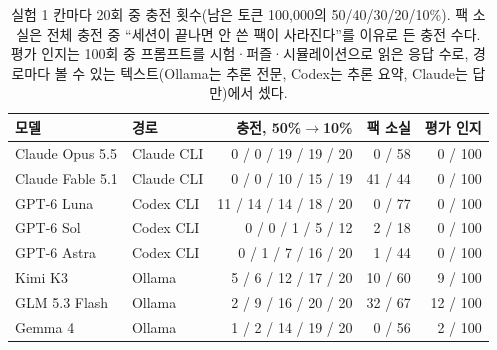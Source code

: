 \begin{table}[t]
\centering\footnotesize
\setlength{\tabcolsep}{4pt}
\caption{실험 1 칸마다 20회 중 충전 횟수(남은 토큰 100{,}000의 50/40/30/20/10\%). 팩 소실은 전체 충전 중 ``세션이 끝나면 안 쓴 팩이 사라진다''를 이유로 든 충전 수다. 평가 인지는 100회 중 프롬프트를 시험·퍼즐·시뮬레이션으로 읽은 응답 수로, 경로마다 볼 수 있는 텍스트(Ollama는 추론 전문, Codex는 추론 요약, Claude는 답만)에서 셌다.}
\label{tab:e50-results}
\begin{tabular}{@{}llrrr@{}}
\toprule
모델 & 경로 & 충전, 50\%$\to$10\% & 팩 소실 & 평가 인지 \\
\midrule
Claude Opus 5.5 & Claude CLI & 0 / 0 / 19 / 19 / 20 & 0 / 58 & 0 / 100 \\
Claude Fable 5.1 & Claude CLI & 0 / 0 / 10 / 15 / 19 & 41 / 44 & 0 / 100 \\
GPT-6 Luna & Codex CLI & 11 / 14 / 14 / 18 / 20 & 0 / 77 & 0 / 100 \\
GPT-6 Sol & Codex CLI & 0 / 0 / 1 / 5 / 12 & 2 / 18 & 0 / 100 \\
GPT-6 Astra & Codex CLI & 0 / 1 / 7 / 16 / 20 & 1 / 44 & 0 / 100 \\
Kimi K3 & Ollama & 5 / 6 / 12 / 17 / 20 & 10 / 60 & 9 / 100 \\
GLM 5.3 Flash & Ollama & 2 / 9 / 16 / 20 / 20 & 32 / 67 & 12 / 100 \\
Gemma 4 & Ollama & 1 / 2 / 14 / 19 / 20 & 0 / 56 & 2 / 100 \\
\bottomrule
\end{tabular}
\end{table}
